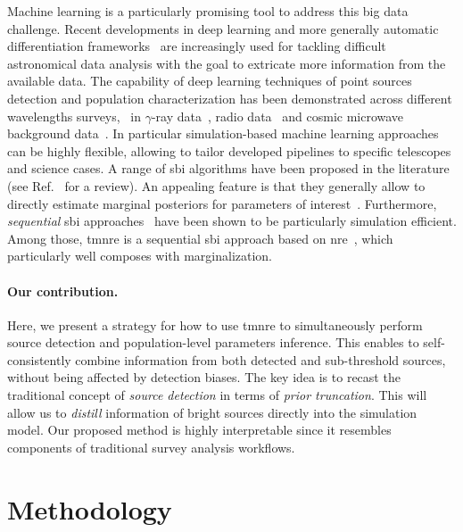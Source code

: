 Machine learning is a particularly promising tool to address this big data challenge. Recent developments in deep learning and more generally automatic differentiation frameworks~\citep{baydin2018automatic} are increasingly used for tackling difficult astronomical data analysis with the goal to extricate more information from the available data. The capability of deep learning techniques of point sources detection and population characterization has been demonstrated across different wavelengths surveys, \eg~in $\gamma$-ray data~\citep{Panes:2021zig, Caron:2017udl, List:2021aer, Mishra-Sharma:2021oxe}, radio data~\citep{VafaeiSadr:2018tac, Rezaei:2021aa, Lukic:2019aa, Tilley:2020aa} and cosmic microwave background data~\citep{Bonavera:2021aa}.
In particular simulation-based machine learning approaches can be highly flexible, allowing to tailor developed pipelines to specific telescopes and science cases. 
A range of \gls*{sbi} algorithms have been proposed in the literature (see Ref.~\cite{Cranmer:2019eaq} for a review). An appealing feature is that they generally allow to directly estimate marginal posteriors for parameters of interest~\citep{Miller:2020hua}. Furthermore, \textit{sequential} \gls*{sbi} approaches~\citep{Durkan:2018aa, Papamakarios:2016ctj, Papamakarios:2018aa} have been shown to be particularly simulation efficient.  Among those, \gls*{tmnre} \citep{Miller:2020hua, Miller:2021aa} is a sequential \gls*{sbi} approach 
based on \gls*{nre}~\citep{Hermans:2019ioj},  which particularly well composes with marginalization.

\paragraph{Our contribution.}  Here, we present a strategy for how to use \gls*{tmnre} to simultaneously perform source detection and population-level parameters inference. This enables to self-consistently combine information from both detected and sub-threshold sources, without being affected by detection biases. The key idea is to recast the traditional concept of \emph{source detection} in terms of \emph{prior truncation}.  This will allow us to \textit{distill} information of bright sources directly into the simulation model. Our proposed method is highly interpretable since it resembles components of traditional survey analysis workflows. 


\section{Methodology}
\label{sec:ps-method}

